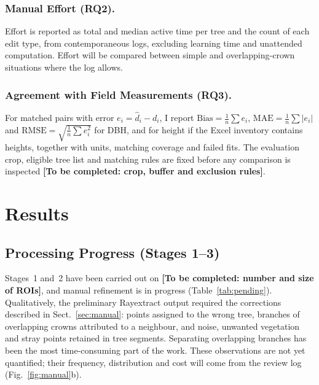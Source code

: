 \documentclass[runningheads]{llncs}
\newcommand{\todo}[1]{\textbf{[To be completed: #1]}}
\begin{document}
\subsubsection{Manual Effort (RQ2).}
Effort is reported as total and median active time per tree and the count of each edit type, from contemporaneous logs, excluding learning time and unattended computation. Effort will be compared between simple and overlapping-crown situations where the log allows.

\subsubsection{Agreement with Field Measurements (RQ3).}
For matched pairs with error $e_i=\hat d_i-d_i$, I report $\text{Bias}=\tfrac1n\sum e_i$, $\text{MAE}=\tfrac1n\sum|e_i|$ and $\text{RMSE}=\sqrt{\tfrac1n\sum e_i^2}$ for DBH, and for height if the Excel inventory contains heights, together with units, matching coverage and failed fits. The evaluation crop, eligible tree list and matching rules are fixed before any comparison is inspected \todo{crop, buffer and exclusion rules}.

\section{Results}\label{sec:results}

\subsection{Processing Progress (Stages 1--3)}\label{sec:res-proc}
Stages~1 and~2 have been carried out on \todo{number and size of ROIs}, and manual refinement is in progress (Table~\ref{tab:pending}). Qualitatively, the preliminary Rayextract output required the corrections described in Sect.~\ref{sec:manual}: points assigned to the wrong tree, branches of overlapping crowns attributed to a neighbour, and noise, unwanted vegetation and stray points retained in tree segments. Separating overlapping branches has been the most time-consuming part of the work. These observations are not yet quantified; their frequency, distribution and cost will come from the review log (Fig.~\ref{fig:manual}b).
\end{document}
